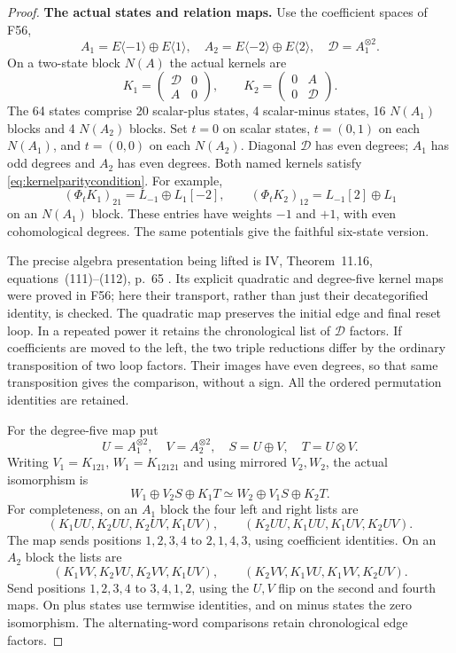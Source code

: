 \documentclass[11pt,a4paper]{article}
\newcommand{\A}{\mathbb A}\newcommand{\PP}{\mathbb P}\newcommand{\GL}{\mathrm{GL}}
\newcommand{\fid}[1]{\textsf{#1}}\newcommand{\gate}[1]{\textsf{#1}}
\theoremstyle{named}\newtheorem{finding}{Finding}[section]
\theoremstyle{definition}\newtheorem{definition}[finding]{Definition}
\theoremstyle{remark}\newtheorem{remark}[finding]{Remark}
\begin{document}
\begin{proof}
\par\smallskip\noindent\textbf{The actual states and relation maps.}\quad
Use the coefficient spaces of \fid{F56},
\[
 A_1=E\langle-1\rangle\oplus E\langle1\rangle,\quad
 A_2=E\langle-2\rangle\oplus E\langle2\rangle,\quad
 \mathcal D=A_1^{\otimes2}.
\]
On a two-state block \(N(A)\) the actual kernels are
\[
 K_1=\begin{pmatrix}\mathcal D&0\\A&0\end{pmatrix},
 \qquad
 K_2=\begin{pmatrix}0&A\\0&\mathcal D\end{pmatrix}.
\]
The 64 states comprise 20 scalar-plus states, 4
scalar-minus states, 16 \(N(A_1)\) blocks and 4
\(N(A_2)\) blocks. Set \(t=0\) on scalar states,
\(t=(0,1)\) on each \(N(A_1)\), and \(t=(0,0)\)
on each \(N(A_2)\). Diagonal \(\mathcal D\) has
even degrees; \(A_1\) has odd degrees and \(A_2\)
has even degrees. Both named kernels satisfy
\eqref{eq:kernelparitycondition}.
For example,
\[
 (\Phi_tK_1)_{21}=L_{-1}\oplus L_1[-2],
 \qquad
 (\Phi_tK_2)_{12}=L_{-1}[2]\oplus L_1
\]
on an \(N(A_1)\) block. These entries have weights
\(-1\) and \(+1\), with even cohomological degrees.
The same potentials give the faithful six-state version.

The precise algebra presentation being lifted is IV,
Theorem~11.16, equations~(111)--(112), p.~65
\cite{IV}. Its explicit quadratic and degree-five kernel
maps were proved in \fid{F56}; here their transport,
rather than just their decategorified identity, is checked.
The quadratic map preserves the initial edge and final
reset loop. In a repeated power it retains the
chronological list of \(\mathcal D\) factors.
If coefficients are moved to the left, the two triple
reductions differ by the ordinary transposition of two
loop factors. Their images have even degrees, so that
same transposition gives the comparison, without a sign.
All the ordered permutation identities are retained.

For the degree-five map put
\[
 U=A_1^{\otimes2},\quad V=A_2^{\otimes2},\quad
 S=U\oplus V,\quad T=U\otimes V.
\]
Writing \(V_1=K_{121}\), \(W_1=K_{12121}\) and
using mirrored \(V_2,W_2\), the actual isomorphism is
\begin{equation}\label{eq:puredegreefivemap}
 W_1\oplus V_2S\oplus K_1T
       \simeq W_2\oplus V_1S\oplus K_2T.
\end{equation}
For completeness, on an \(A_1\) block the four left and
right lists are
\[
 (K_1UU,K_2UU,K_2UV,K_1UV),\qquad
 (K_2UU,K_1UU,K_1UV,K_2UV).
\]
The map sends positions \(1,2,3,4\) to \(2,1,4,3\),
using coefficient identities. On an \(A_2\) block the
lists are
\[
 (K_1VV,K_2VU,K_2VV,K_1UV),\qquad
 (K_2VV,K_1VU,K_1VV,K_2UV).
\]
Send positions \(1,2,3,4\) to \(3,4,1,2\), using the
\(U,V\) flip on the second and fourth maps.
On plus states use termwise identities, and on minus
states the zero isomorphism.
The alternating-word comparisons retain chronological
edge factors.


\end{proof}
\end{document}

